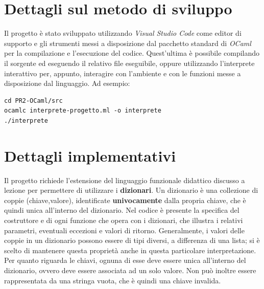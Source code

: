 \documentclass[10pt, italian, openany]{book}
\begin{document}
\section{Dettagli sul metodo di sviluppo}
Il progetto è stato sviluppato utilizzando \textit{Visual Studio Code} come editor di supporto e gli strumenti messi a disposizione dal pacchetto standard di \textit{OCaml} per la compilazione e l'esecuzione del codice. Quest'ultima è possibile compilando il sorgente ed eseguendo il relativo file eseguibile, oppure utilizzando l'interprete interattivo per, appunto, interagire con l'ambiente e con le funzioni messe a disposizione dal linguaggio. Ad esempio:

\begin{lstlisting}[style=bash]
cd PR2-OCaml/src
ocamlc interprete-progetto.ml -o interprete
./interprete
\end{lstlisting}

\section{Dettagli implementativi}
Il progetto richiede l'estensione del linguaggio funzionale didattico discusso a lezione per permettere di utilizzare i \textbf{dizionari}. Un dizionario è una collezione di coppie (chiave,valore), identificate \textbf{univocamente} dalla propria chiave, che è quindi unica all'interno del dizionario. Nel codice è presente la specifica del costruttore e di ogni funzione che opera con i dizionari, che illustra i relativi parametri, eventuali eccezioni e valori di ritorno. Generalmente, i valori delle coppie in un dizionario possono essere di tipi diversi, a differenza di una lista; si è scelto di mantenere questa proprietà anche in questa particolare interpretazione.
Per quanto riguarda le chiavi, ognuna di esse deve essere unica all'interno del dizionario, ovvero deve essere associata ad un solo valore. Non può inoltre essere rappresentata da una stringa vuota, che è quindi una chiave invalida.
\end{document}
